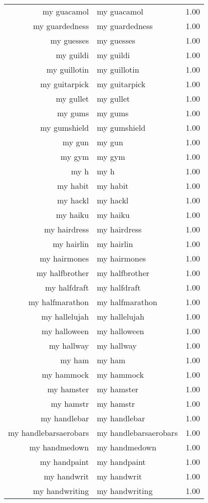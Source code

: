 \begin{table}[ht]
\begin{tabular}{rlr}
  my guacamol & my guacamol & 1.00 \\ 
  my guardedness & my guardedness & 1.00 \\ 
  my guesses & my guesses & 1.00 \\ 
  my guildi & my guildi & 1.00 \\ 
  my guillotin & my guillotin & 1.00 \\ 
  my guitarpick & my guitarpick & 1.00 \\ 
  my gullet & my gullet & 1.00 \\ 
  my gums & my gums & 1.00 \\ 
  my gumshield & my gumshield & 1.00 \\ 
  my gun & my gun & 1.00 \\ 
  my gym & my gym & 1.00 \\ 
  my h & my h & 1.00 \\ 
  my habit & my habit & 1.00 \\ 
  my hackl & my hackl & 1.00 \\ 
  my haiku & my haiku & 1.00 \\ 
  my hairdress & my hairdress & 1.00 \\ 
  my hairlin & my hairlin & 1.00 \\ 
  my hairmones & my hairmones & 1.00 \\ 
  my halfbrother & my halfbrother & 1.00 \\ 
  my halfdraft & my halfdraft & 1.00 \\ 
  my halfmarathon & my halfmarathon & 1.00 \\ 
  my hallelujah & my hallelujah & 1.00 \\ 
  my halloween & my halloween & 1.00 \\ 
  my hallway & my hallway & 1.00 \\ 
  my ham & my ham & 1.00 \\ 
  my hammock & my hammock & 1.00 \\ 
  my hamster & my hamster & 1.00 \\ 
  my hamstr & my hamstr & 1.00 \\ 
  my handlebar & my handlebar & 1.00 \\ 
  my handlebarsaerobars & my handlebarsaerobars & 1.00 \\ 
  my handmedown & my handmedown & 1.00 \\ 
  my handpaint & my handpaint & 1.00 \\ 
  my handwrit & my handwrit & 1.00 \\ 
  my handwriting & my handwriting & 1.00 \\ 

\end{tabular}
\end{table}
